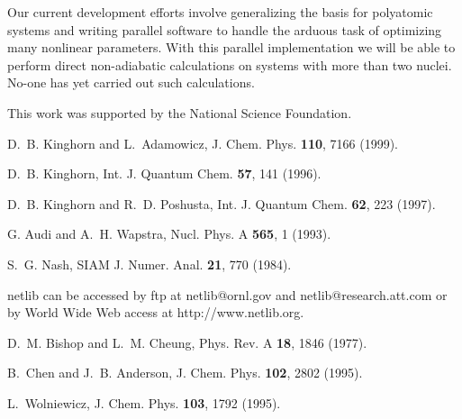 Our current development efforts involve generalizing the basis for 
polyatomic systems and writing parallel software to handle
the arduous task of optimizing many nonlinear parameters. 
With this parallel implementation we will be able to perform
direct non-adiabatic calculations on systems with more than two nuclei.
No-one has yet carried out such calculations.
 

\acknowledgements
This work was supported by the National Science Foundation.


\begin{references}

D.~B. Kinghorn and L.~Adamowicz,
\newblock J. Chem. Phys. {\bf 110}, 7166 (1999).

D.~B. Kinghorn,
\newblock Int. J. Quantum Chem. {\bf 57}, 141 (1996).

D.~B. Kinghorn and R.~D. Poshusta,
\newblock Int. J. Quantum Chem. {\bf 62}, 223 (1997).

G. Audi and A.~H. Wapstra, Nucl. Phys. A {\bf 565},  1  (1993).

S.~G. Nash,
\newblock SIAM J. Numer. Anal. {\bf 21}, 770 (1984).

netlib can be accessed by ftp at netlib@ornl.gov and 
netlib@research.att.com or by World Wide Web access at http://www.netlib.org.

D.~M. Bishop and L.~M. Cheung,
\newblock Phys. Rev. A {\bf 18}, 1846 (1977).

B.~Chen and J.~B. Anderson,
\newblock J. Chem. Phys. {\bf 102}, 2802 (1995).

L.~Wolniewicz,
\newblock J. Chem. Phys. {\bf 103}, 1792 (1995).

\end{references}

\newpage
\mediumtext

